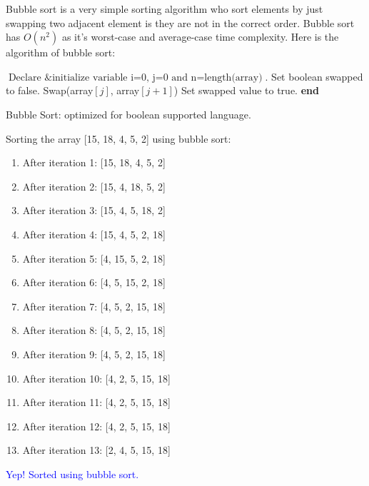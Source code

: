 \justify
{
 Bubble sort is a very simple sorting algorithm who sort elements by just swapping two adjacent element is they are not in the correct order. Bubble sort has $O(n^2)$ as it's worst-case and average-case time complexity. Here is the algorithm of bubble sort:
}
\begin{algorithm}
\DontPrintSemicolon
{}
\Begin
{
$\textrm{Declare \& initialize variable i=0, j=0 and n}=\textrm{length(array)}$.\;
Set boolean swapped to false.\;
{
	{
		{
			Swap(array$[j]$, array$[j+1]$)\;
			Set swapped value to true.
		}
	}
}
}
\textbf{end}
\caption{Bubble Sort: optimized for boolean supported language.}
\end{algorithm}

Sorting the array [15, 18, 4, 5, 2] using bubble sort:
\begin{enumerate}
	\item After iteration 1: [15, 18, 4, 5, 2]
	\item After iteration 2: [15, 4, 18, 5, 2]
	\item After iteration 3: [15, 4, 5, 18, 2]
	\item After iteration 4: [15, 4, 5, 2, 18]
	\item After iteration 5: [4, 15, 5, 2, 18]
	\item After iteration 6: [4, 5, 15, 2, 18]
	\item After iteration 7: [4, 5, 2, 15, 18]
	\item After iteration 8: [4, 5, 2, 15, 18]
	\item After iteration 9: [4, 5, 2, 15, 18]
	\item After iteration 10: [4, 2, 5, 15, 18]
	\item After iteration 11: [4, 2, 5, 15, 18]
	\item After iteration 12: [4, 2, 5, 15, 18]
	\item After iteration 13: [2, 4, 5, 15, 18]
\end{enumerate}
\textcolor{blue}{Yep! Sorted using bubble sort.}